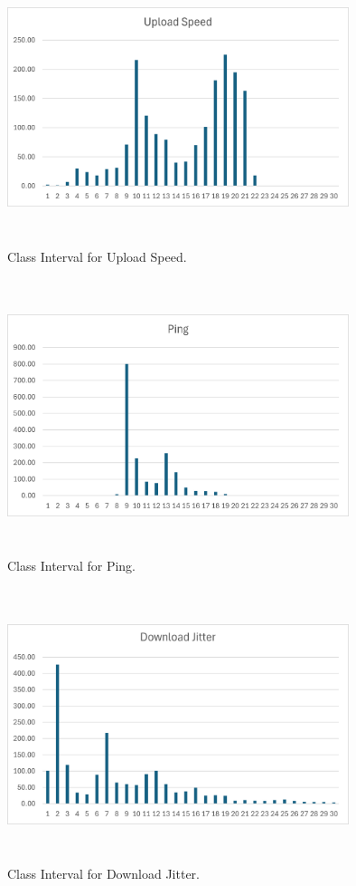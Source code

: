 \documentclass[conference]{IEEEtran}
\begin{document}
\begin{figure}[htbp]
    \centerline{\includegraphics[width=10cm,height=8cm,keepaspectratio]{Figures/Picture25.png}}
    \caption{Class Interval for Upload Speed.}
    \label{fig16}
\end{figure}

\begin{figure}[htbp]
    \centerline{\includegraphics[width=10cm,height=8cm,keepaspectratio]{Figures/Picture26.png}}
    \caption{Class Interval for Ping.}
    \label{fig17}
\end{figure}

\begin{figure}[htbp]
    \centerline{\includegraphics[width=10cm,height=8cm,keepaspectratio]{Figures/Picture27.png}}
    \caption{Class Interval for Download Jitter.}
    \label{fig17}
\end{figure}
\end{document}
